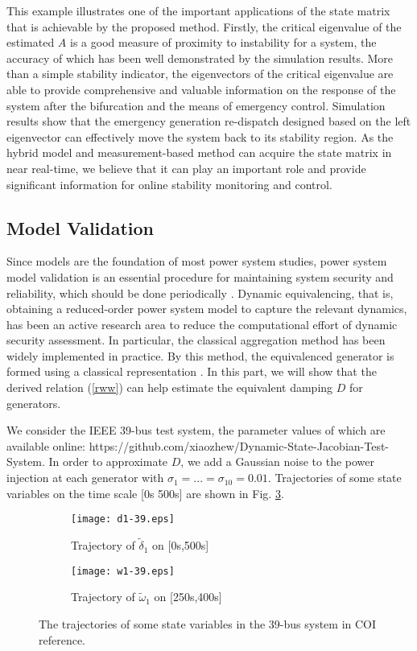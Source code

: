 \documentclass[journal]{IEEEtran}
\begin{document}
This example illustrates one of the important applications of the state matrix that is achievable by the proposed method. Firstly, the critical eigenvalue of the estimated $A$ is a good measure of proximity to instability for a system, the accuracy of which has been well demonstrated by the simulation results. More than a simple stability indicator, the eigenvectors of the critical eigenvalue are able to provide comprehensive and valuable information on the response of the system after the bifurcation and the means of emergency control. Simulation results show that the emergency generation re-dispatch designed based on the left eigenvector can effectively move the system back to its stability region. As the hybrid model and measurement-based method can acquire the state matrix in near real-time, we believe that it can play an important role and provide significant information for online stability monitoring and control.

\subsection{Model Validation}
Since models are the foundation of most power system studies, power system model validation is an essential procedure for maintaining system security and reliability, which should be done periodically \cite{Bialek:2014}\cite{Pourbeik:2010}. Dynamic equivalencing, that is, obtaining a reduced-order power system model to capture the relevant dynamics, has been an active research area to reduce the computational effort of dynamic security assessment. In particular, the classical aggregation method has been widely implemented in practice. By this method, the equivalenced generator is formed using a classical representation \cite{Vittal:2013}. In this part, we will show that the derived relation (\ref{rww}) can help estimate the equivalent damping $D$ for generators.

We consider the IEEE 39-bus test system, the parameter values of which are available online: https://github.com/xiaozhew/Dynamic-State-Jacobian-Test-System. In order to approximate $D$, we add a Gaussian noise to the power injection at each generator with $\sigma_1=...=\sigma_{10}=0.01$. Trajectories of some state variables on the time scale [0s 500s] are shown in Fig. \ref{39-modelvalidation}.

\begin{figure}[!ht]
\centering
\begin{subfigure}[t]{0.5\linewidth}
\texttt{[image: d1-39.eps]}
\caption{Trajectory of $\tilde{\delta}_{1}$ on [0s,500s]}\label{d1-39}
\end{subfigure}\begin{subfigure}[t]{0.5\linewidth}
\texttt{[image: w1-39.eps]}
\caption{Trajectory of $\tilde{\omega}_{1}$ on [250s,400s]}\label{w1-39}
\end{subfigure}
\caption{The trajectories of some state variables in the 39-bus system in COI reference.}\label{39-modelvalidation}
\end{figure}
\end{document}
